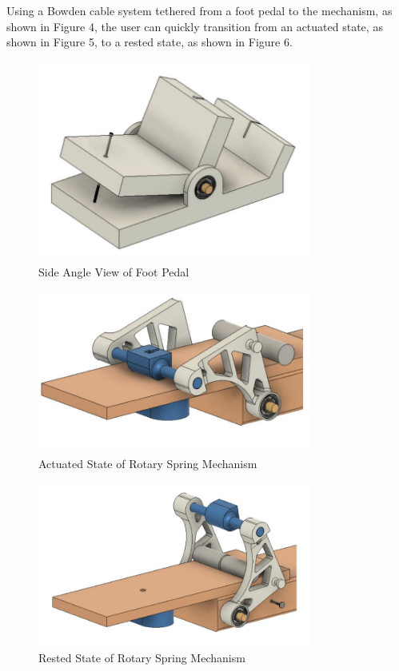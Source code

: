 \documentclass[12pt]{article}
\theoremstyle{definition} %
\theoremstyle{plain} %
\begin{document}
Using a Bowden cable system tethered from a foot pedal to the mechanism, as shown in
Figure 4, the user can quickly transition from an actuated state, as shown in Figure 5, to a rested
state, as shown in Figure 6.

\begin{figure}[htbp]
  \centering
  \includegraphics[width=0.8\textwidth]{fgs/fig4.png}
  \caption{Side Angle View of Foot Pedal}
  \label{fig:}
\end{figure}

\begin{figure}[htbp]
  \centering
  \includegraphics[width=0.8\textwidth]{fgs/fig5.png}
  \caption{Actuated State of Rotary Spring Mechanism}
  \label{fig:}
\end{figure}

\begin{figure}[htbp]
  \centering
  \includegraphics[width=0.8\textwidth]{fgs/fig6.png}
  \caption{Rested State of Rotary Spring Mechanism}
  \label{fig:}
\end{figure}
\end{document}
